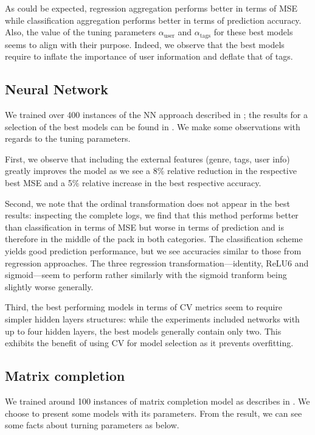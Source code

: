 \documentclass[bj, preprint]{imsart}
\begin{document}
As could be expected, regression aggregation performs better in terms of MSE while classification aggregation performs better in terms of prediction accuracy. Also, the value of the tuning parameters $\alpha_\text{user}$ and $\alpha_\text{tags}$ for these best models seems to align with their purpose. Indeed, we observe that the best models require to inflate the importance of user information and deflate that of tags.




\subsection{Neural Network}\label{sebsec:results.nn}

We trained over 400 instances of the NN approach described in ; the results for a selection of the best models can be found in . We make some observations with regards to the tuning parameters.

First, we observe that including the external features (genre, tags, user info) greatly improves the model as we see a 8\% relative reduction in the respective best MSE and a 5\% relative increase in the best respective accuracy. 

Second, we note that the ordinal transformation does not appear in the best results: inspecting the complete logs, we find that this method performs better than classification in terms of MSE but worse in terms of prediction and is therefore in the middle of the pack in both categories. The classification scheme yields good prediction performance, but we see accuracies similar to those from regression approaches. The three regression transformation---identity, ReLU6 and sigmoid---seem to perform rather similarly with the sigmoid tranform being slightly worse generally.

Third, the best performing models in terms of CV metrics seem to require simpler hidden layers structures: while the experiments included networks with up to four hidden layers, the best models generally contain only two. This exhibits the benefit of using CV for model selection as it prevents overfitting.





\subsection{Matrix completion}\label{sebsec:results.svd}
We trained around 100 instances of matrix completion model as describes in . We choose to present some models with its parameters. From the result, we can see some facts about turning parameters as below.
\end{document}
